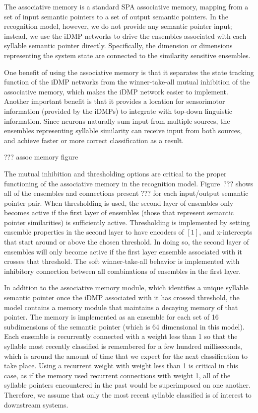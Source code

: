 The associative memory is a standard
SPA associative memory,
mapping from a set of input semantic pointers
to a set of output semantic pointers.
In the recognition model, however,
we do not provide any semantic pointer input;
instead, we use the iDMP networks
to drive the ensembles associated
with each syllable semantic pointer directly.
Specifically, the dimension or dimensions
representing the system state
are connected to the similarity sensitive ensembles.

One benefit of using the associative memory
is that it separates the state tracking function
of the iDMP networks
from the winner-take-all mutual inhibition
of the associative memory,
which makes the iDMP network easier to implement.
Another important benefit is that
it provides a location for
sensorimotor information
(provided by the iDMPs)
to integrate with top-down
linguistic information.
Since neurons naturally sum
input from multiple sources,
the ensembles representing syllable similarity
can receive input from both sources,
and achieve faster or more correct classification
as a result.

??? assoc memory figure

The mutual inhibition and thresholding options
are critical to the proper functioning
of the associative memory
in the recognition model.
Figure~??? shows all of the
ensembles and connections present
??? for each input/output semantic pointer pair.
When thresholding is used,
the second layer of ensembles
only becomes active if
the first layer of ensembles
(those that represent semantic pointer similarities)
is sufficiently active.
Thresholding is implemented by
setting ensemble properties in the second layer
to have encoders of $[1]$,
and x-intercepts that start around or above
the chosen threshold.
In doing so, the second layer of ensembles
will only become active if the
first layer ensemble associated with it
crosses that threshold.
The soft winner-take-all behavior
is implemented with inhibitory connection
between all combinations of ensembles
in the first layer.

In addition to the associative memory module,
which identifies a unique syllable semantic pointer
once the iDMP associated with it has crossed threshold,
the model contains a memory module
that maintains a decaying memory
of that pointer.
The memory is implemented as an ensemble
for each set of 16 subdimensions
of the semantic pointer
(which is 64 dimensional in this model).
Each ensemble is recurrently connected
with a weight less than 1
so that the syllable most recently classified
is remembered for a few hundred milliseconds,
which is around the amount of time that we expect
for the next classification to take place.
Using a recurrent weight
with weight less than 1
is critical in this case,
as if the memory used recurrent connections
with weight 1,
all of the syllable pointers
encountered in the past would be
superimposed on one another.
Therefore, we assume that
only the most recent syllable classified
is of interest to downstream systems.

